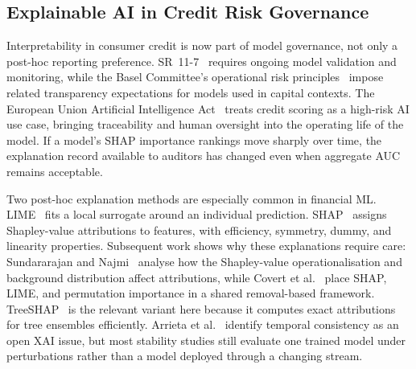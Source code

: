 \documentclass[pdflatex,sn-mathphys-num]{sn-jnl}
\theoremstyle{thmstyleone}
\theoremstyle{thmstyletwo}
\theoremstyle{thmstylethree}
\begin{document}
\subsection{Explainable AI in Credit Risk Governance}
\label{sec:related:xai}

Interpretability in consumer credit is now part of model governance, not only a
post-hoc reporting preference. SR~11-7~\cite{sr117_2011} requires ongoing model
validation and monitoring, while the Basel Committee's operational risk
principles~\cite{basel2011} impose related transparency expectations for models
used in capital contexts. The European Union Artificial Intelligence
Act~\cite{eu_ai_act2024} treats credit scoring as a high-risk AI use case,
bringing traceability and human oversight into the operating life of the model.
If a model's SHAP importance rankings move sharply over time, the explanation
record available to auditors has changed even when aggregate AUC remains
acceptable.

Two post-hoc explanation methods are especially common in financial ML.
LIME~\cite{ribeiro2016lime} fits a local surrogate around an individual prediction.
SHAP~\cite{lundberg2017shap} assigns Shapley-value attributions to features,
with efficiency, symmetry, dummy, and linearity properties. Subsequent work shows
why these explanations require care: Sundararajan and
Najmi~\cite{sundararajan2020shapley} analyse how the Shapley-value
operationalisation and background distribution affect attributions, while Covert
et al.~\cite{covert2021removing} place SHAP, LIME, and permutation importance in
a shared removal-based framework. TreeSHAP~\cite{lundberg2020trees} is the
relevant variant here because it computes exact attributions for tree ensembles
efficiently. Arrieta et al.~\cite{arrieta2020xai} identify temporal consistency
as an open XAI issue, but most stability studies still evaluate one trained
model under perturbations rather than a model deployed through a changing stream.
\end{document}
